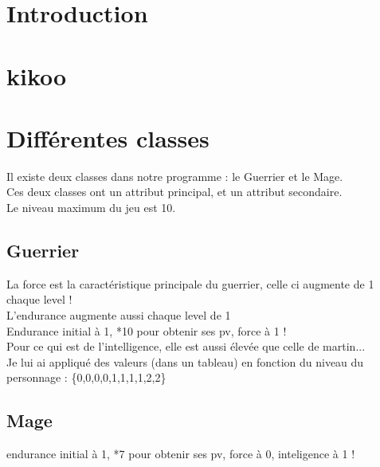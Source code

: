 \documentclass[8pt,a4paper,titlepage]{article}
\author{Baptiste Vergote & Martin Schreinemachers}
\begin{document}
\clearpage
\noindent
\tableofcontents
\clearpage
\section{Introduction}
\clearpage
\section{kikoo}

\section{Différentes classes}
	Il existe deux classes dans notre programme : le Guerrier et le Mage.\\
	Ces deux classes ont un attribut principal, et un attribut secondaire.\\
	Le niveau maximum du jeu est 10.
\subsection{Guerrier}
	La force est la caractéristique principale du guerrier, celle ci augmente de 1 chaque level !\\
	L'endurance augmente aussi chaque level de 1\\
	Endurance initial à 1, *10 pour obtenir ses pv, force à 1 !\\
	Pour ce qui est de l'intelligence, elle est aussi élevée que celle de martin...\\ Je lui ai appliqué des valeurs (dans un tableau) en fonction du niveau du personnage : 	\{0,0,0,0,1,1,1,1,2,2\}
	
	
	
\subsection{Mage}
	endurance initial à 1, *7 pour obtenir ses pv, force à 0, inteligence à 1 !
\end{document}
